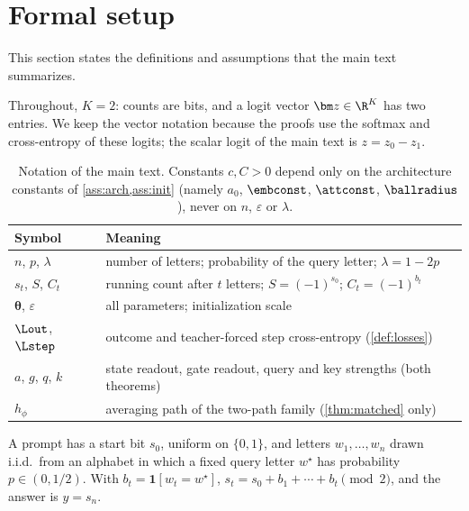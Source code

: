 \providecommand{\reg}[1]{\ensuremath{\mathsf{#1}}}

\section{Formal setup}
\label{app:formal}

This section states the definitions and assumptions that the main text summarizes.

\label{app:setup}
Throughout, $K=2$: counts are bits, and a logit vector $\bm z\in\R^K$ has two entries. We keep the vector notation because the
proofs use the softmax and cross-entropy of these logits; the scalar logit of the main text is $z=z_0-z_1$.

\begin{table}[H]
\centering\small
\caption{Notation of the main text. Constants $c,C>0$ depend only on the architecture constants of
\cref{ass:arch,ass:init} (namely $a_0$, $\embconst$, $\attconst$, $\ballradius$), never on $n$, $\varepsilon$ or $\lambda$.}
\label{tab:notation}
\begin{tabular}{@{}ll@{}}
\toprule
Symbol & Meaning\\
\midrule
$n$, $p$, $\lambda$ & number of letters; probability of the query letter; $\lambda=1-2p$\\
$s_t$, $S$, $C_t$ & running count after $t$ letters; $S=(-1)^{s_0}$; $C_t=(-1)^{b_t}$\\
$\bm\theta$, $\varepsilon$ & all parameters; initialization scale\\
$\Lout$, $\Lstep$ & outcome and teacher-forced step cross-entropy (\cref{def:losses})\\
$a$, $g$, $q$, $k$ & state readout, gate readout, query and key strengths (both theorems)\\
$h_\phi$ & averaging path of the two-path family (\cref{thm:matched} only)\\
\bottomrule
\end{tabular}
\end{table}

\begin{definition}[Counting]
\label{def:task}
A prompt has a start bit $s_0$, uniform on $\{0,1\}$, and letters $w_1,\ldots,w_n$ drawn i.i.d.\ from an alphabet
in which a fixed query letter $w^\star$ has probability $p\in(0,1/2)$. With $b_t=\mathbf 1[w_t=w^\star]$,
$s_t=s_0+b_1+\cdots+b_t\pmod 2$, and the answer is $y=s_n$.
\end{definition}

